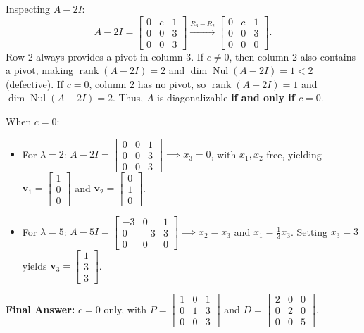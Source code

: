 \documentclass[11pt, letterpaper]{article}
\theoremstyle{definition}
\theoremstyle{remark}
\begin{document}
Inspecting $A - 2I$:
\[
A - 2I = \begin{bmatrix} 0 & c & 1 \\ 0 & 0 & 3 \\ 0 & 0 & 3 \end{bmatrix} \xrightarrow{R_{3} - R_{2}} \begin{bmatrix} 0 & c & 1 \\ 0 & 0 & 3 \\ 0 & 0 & 0 \end{bmatrix}.
\]
Row $2$ always provides a pivot in column $3$. If $c \neq 0$, then column $2$ also contains a pivot, making $\operatorname{rank}(A - 2I) = 2$ and $\dim\operatorname{Nul}(A - 2I) = 1 < 2$ (defective). If $c = 0$, column $2$ has no pivot, so $\operatorname{rank}(A - 2I) = 1$ and $\dim\operatorname{Nul}(A - 2I) = 2$. Thus, $A$ is diagonalizable \textbf{if and only if $c = 0$}.

When $c = 0$:
\begin{itemize}
    \item For $\lambda = 2$: $A - 2I = \begin{bmatrix} 0 & 0 & 1 \\ 0 & 0 & 3 \\ 0 & 0 & 3 \end{bmatrix} \implies x_{3} = 0$, with $x_{1}, x_{2}$ free, yielding $\mathbf{v}_{1} = \begin{bmatrix} 1 \\ 0 \\ 0 \end{bmatrix}$ and $\mathbf{v}_{2} = \begin{bmatrix} 0 \\ 1 \\ 0 \end{bmatrix}$.
    \item For $\lambda = 5$: $A - 5I = \begin{bmatrix} -3 & 0 & 1 \\ 0 & -3 & 3 \\ 0 & 0 & 0 \end{bmatrix} \implies x_{2} = x_{3}$ and $x_{1} = \frac{1}{3}x_{3}$. Setting $x_{3} = 3$ yields $\mathbf{v}_{3} = \begin{bmatrix} 1 \\ 3 \\ 3 \end{bmatrix}$.
\end{itemize}
\textbf{Final Answer:} $c = 0$ only, with $P = \begin{bmatrix} 1 & 0 & 1 \\ 0 & 1 & 3 \\ 0 & 0 & 3 \end{bmatrix}$ and $D = \begin{bmatrix} 2 & 0 & 0 \\ 0 & 2 & 0 \\ 0 & 0 & 5 \end{bmatrix}$.
\end{document}
